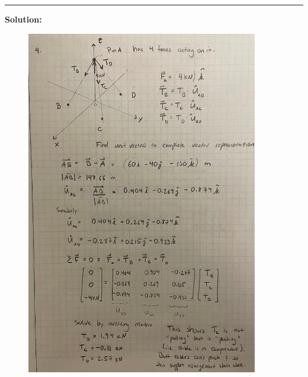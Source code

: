 \vspace{.5cm}
\rule{\textwidth}{.4pt}
\vspace{.5cm}
\textbf{Solution:}
\begin{figure}[ht!]
  \centering
  \includegraphics[width=0.9\textwidth,
	           height=0.3\textheight,
		   keepaspectratio]{soln.png}
\end{figure}
